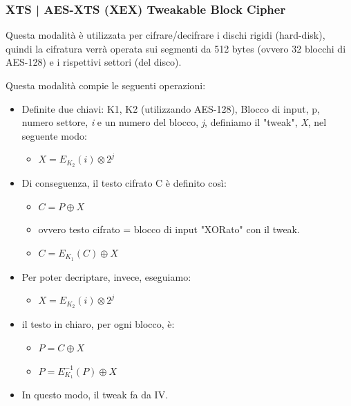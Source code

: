 \subsubsection{XTS | AES-XTS (XEX) Tweakable Block Cipher}

\textsf{\small Questa modalità è utilizzata per cifrare/decifrare i dischi rigidi (hard-disk), quindi la cifratura verrà operata sui segmenti da 512 bytes (ovvero 32 blocchi di AES-128) e i rispettivi settori (del disco).}

\textsf{\small Questa modalità compie le seguenti operazioni: } %

\begin{itemize}
	\item \textsf{\small Definite due chiavi: K1, K2 (utilizzando AES-128), Blocco di input, p, numero settore, \emph{i} e un numero del blocco, \emph{j}, definiamo il "tweak", \emph{X}, nel seguente modo:}
	\begin{itemize}
		\item \textsf{\small $X = E_{K_2}(i) \otimes 2^j$}
	\end{itemize}
	\item \textsf{\small Di conseguenza, il testo cifrato C è definito così:}
	\begin{itemize}
		\item \textsf{\small $C = P \oplus X$}
		\item \textsf{\small ovvero testo cifrato = blocco di input "XORato" con il tweak.}
		\item \textsf{\small $C = E_{K_1}(C) \oplus X$}
	\end{itemize}
	\item \textsf{\small Per poter decriptare, invece, eseguiamo: }
	\begin{itemize}
		\item \textsf{\small $X = E_{K_2} (i) \otimes 2^j$}
	\end{itemize}
	\item \textsf{\small il testo in chiaro, per ogni blocco, è:}
	\begin{itemize}
		\item \textsf{\small $P = C \oplus X$}
		\item \textsf{\small $P = E^{-1}_{K_1} (P) \oplus X$}
	\end{itemize}
	\item \textsf{\small In questo modo, il tweak fa da IV.}
\end{itemize}

